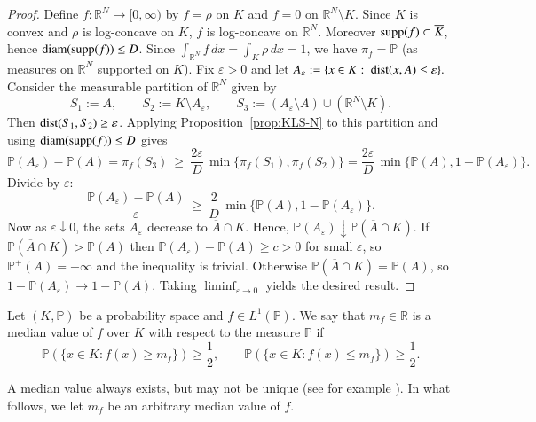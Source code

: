 \documentclass[12pt]{amsart}
\begin{document}
\begin{proof}
Define $f:\mathbb R^N\to[0,\infty)$ by $f=\rho$ on $K$ and $f=0$ on $\mathbb R^N\setminus K$.
Since $K$ is convex and $\rho$ is log-concave on $K$,  $f$
is log-concave on $\mathbb R^N$. Moreover ${\rm supp}(f)\subset\overline K$, hence
${\rm diam}({\rm supp}(f))\le D$.
Since $\int_{\mathbb R^N}f\,dx=\int_K\rho\,dx=1$, we have $\pi_f=\mathbb{P}$ (as measures on $\mathbb R^N$ supported on $K$).
Fix $\varepsilon>0$ and let
$
A_\varepsilon:=\{x\in K:\ {\rm dist}(x,A)\le \varepsilon\}.
$
Consider the measurable partition of $\mathbb R^N$ given by
\[
S_1:=A,\qquad S_2:=K\setminus A_\varepsilon,\qquad S_3:=(A_\varepsilon\setminus A)\cup(\mathbb R^N\setminus K).
\]
Then ${\rm dist}(S_1,S_2)\ge \varepsilon$.
Applying Proposition~\ref{prop:KLS-N} to this partition and using ${\rm diam}({\rm supp}(f))\le D$ gives
\[
\mathbb{P}(A_\varepsilon)-\mathbb{P}(A)=\pi_f(S_3)
\ \ge\ \frac{2\varepsilon}{D}\,\min\{\pi_f(S_1),\pi_f(S_2)\}
=\frac{2\varepsilon}{D}\,\min\{\mathbb{P}(A),1-\mathbb{P}(A_\varepsilon)\}.
\]
Divide by $\varepsilon$:
\[
\frac{\mathbb{P}(A_\varepsilon)-\mathbb{P}(A)}{\varepsilon}
\ \ge\ \frac{2}{D}\,\min\{\mathbb{P}(A),1-\mathbb{P}(A_\varepsilon)\}.
\]
Now as $\varepsilon\downarrow 0$, the sets $A_\varepsilon$ decrease to $\overline A\cap K$. Hence,
$\mathbb{P}(A_\varepsilon)\downarrow \mathbb{P}(\overline A\cap K)$.
If $\mathbb{P}(\overline A\cap K)>\mathbb{P}(A)$ then $\mathbb{P}(A_\varepsilon)-\mathbb{P}(A)\ge c>0$ for small $\varepsilon$,
so $\mathbb{P}^+(A)=+\infty$ and the inequality is trivial.
Otherwise $\mathbb{P}(\overline A\cap K)=\mathbb{P}(A)$, so $1-\mathbb{P}(A_\varepsilon)\rightarrow 1-\mathbb{P}(A)$.
Taking ${\displaystyle\liminf_{\varepsilon\rightarrow 0}}$ yields the desired result.
\end{proof}

\begin{definition}\label{lem:median-N}
Let $(K,\mathbb{P})$ be a probability space and $f\in L^1(\mathbb{P})$. We say that $m_f\in\mathbb{R}$ is a median value of $f$ over $K$ with respect to the measure $\mathbb{P}$ if
\[
\mathbb{P}(\{x\in K:f(x)\ge m_f\})\ge \frac12,\qquad \mathbb{P}(\{x\in K:f(x)\le m_f\})\ge \frac12.
\]
\end{definition}
A median value always exists, but may not be unique (see for example \cite{Journe}). In what follows, we let $m_f$ be an arbitrary median value of $f$.
\end{document}
